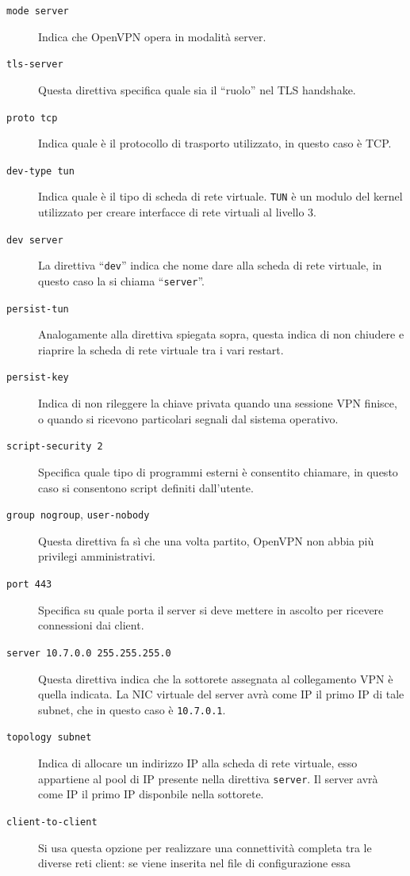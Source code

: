 \begin{description}
	\item[\texttt{mode server}]Indica che OpenVPN opera in modalità server.
	\item[\texttt{tls-server}]Questa direttiva specifica quale sia il ``ruolo'' nel TLS
	handshake.
	\item[\texttt{proto tcp}]Indica quale è il protocollo di trasporto utilizzato,
	in questo caso è TCP.
	\item[\texttt{dev-type tun}]Indica quale è il tipo di scheda di rete virtuale.
	\texttt{TUN} è un modulo del kernel utilizzato per creare interfacce di rete virtuali
	al livello 3.
	\item[\texttt{dev server}]La direttiva ``\texttt{dev}'' indica che nome dare
	alla scheda di rete virtuale, in questo caso la si chiama ``\texttt{server}''.
	\item[\texttt{persist-tun}]Analogamente alla direttiva spiegata sopra, questa
	indica di non chiudere e riaprire la scheda di rete virtuale tra i vari restart.
	\item[\texttt{persist-key}]Indica di non rileggere la chiave privata quando una
	sessione VPN finisce, o quando si ricevono particolari segnali dal sistema operativo.
	\item[\texttt{script-security 2}]Specifica quale tipo di programmi esterni è consentito
	chiamare, in questo caso si consentono script definiti dall'utente.
	\item[\texttt{group nogroup}, \texttt{user-nobody}]Questa direttiva fa
	sì che una volta partito, OpenVPN
	non abbia più privilegi amministrativi.
	\item[\texttt{port 443}]Specifica su quale porta il server si deve mettere in ascolto per
	ricevere connessioni dai client.
	\item[\texttt{server 10.7.0.0 255.255.255.0}]Questa direttiva indica che la sottorete
	assegnata al collegamento VPN è quella indicata. La NIC virtuale del server
	avrà come IP il primo IP di tale subnet, che in questo caso è \texttt{10.7.0.1}.
	\item[\texttt{topology subnet}]Indica di allocare un indirizzo IP alla scheda
	di rete virtuale, esso appartiene al pool di IP presente nella direttiva \texttt{server}.
	Il server avrà come IP il primo IP disponbile nella sottorete.
	\item[\texttt{client-to-client}]Si usa questa opzione per realizzare una connettività
	completa tra le diverse reti client: se viene inserita nel file di configurazione essa

\end{description}

